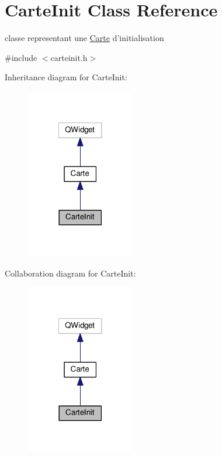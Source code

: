 \hypertarget{classCarteInit}{\section{Carte\+Init Class Reference}
\label{classCarteInit}
}


classe representant une \hyperlink{classCarte}{Carte} d'initialisation  




{\ttfamily \#include $<$carteinit.\+h$>$}



Inheritance diagram for Carte\+Init\+:
\nopagebreak
\begin{figure}[H]
\begin{center}
\leavevmode
\includegraphics[width=134pt]{classCarteInit__inherit__graph}
\end{center}
\end{figure}


Collaboration diagram for Carte\+Init\+:
\nopagebreak
\begin{figure}[H]
\begin{center}
\leavevmode
\includegraphics[width=134pt]{classCarteInit__coll__graph}
\end{center}
\end{figure}
